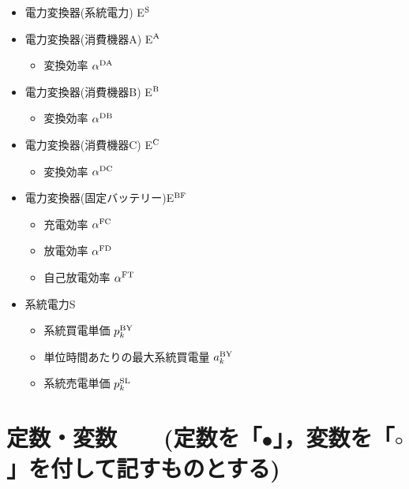 \documentclass{jarticle}
\newcommand{\IB}{$\bullet$}
\newcommand{\IC}{$\circ$}
\newcommand{\IS}{$*$}
\begin{document}
\begin{itemize}
\begin{itemize}
  \end{itemize}
 \item[\IS] 電力変換器(系統電力) E$^{\rm S}$
 \item[\IS] 電力変換器(消費機器A) E$^{\rm A}$
  \begin{itemize}
   \item[\IB] 変換効率 $\alpha^{\rm DA}$
  \end{itemize}
 \item[\IS] 電力変換器(消費機器B) E$^{\rm B}$
  \begin{itemize}
   \item[\IB] 変換効率 $\alpha^{\rm DB}$
  \end{itemize}
 \item[\IS] 電力変換器(消費機器C) E$^{\rm C}$
  \begin{itemize}
   \item[\IB] 変換効率 $\alpha^{\rm DC}$
  \end{itemize}
 \item[\IS] 電力変換器(固定バッテリー)E$^{\rm BF}$
  \begin{itemize}
   \item[\IB] 充電効率 $\alpha^{\rm FC}$
   \item[\IB] 放電効率 $\alpha^{\rm FD}$
   \item[\IB] 自己放電効率 $\alpha^{\rm FT}$
  \end{itemize}
 \item[\IS] 系統電力S
   \begin{itemize}
   \item[\IB] 系統買電単価 $p^{\rm BY}_{k}$
   \item[\IB] 単位時間あたりの最大系統買電量 $a^{\rm BY}_{k}$
   \item[\IB] 系統売電単価 $p^{\rm SL}_{k}$
  \end{itemize}
\end{itemize}

\section{定数・変数 \mbox{\normalsize\rm 
~ (定数を「\IB」，変数を「\IC」を付して記すものとする)}}
\end{document}
